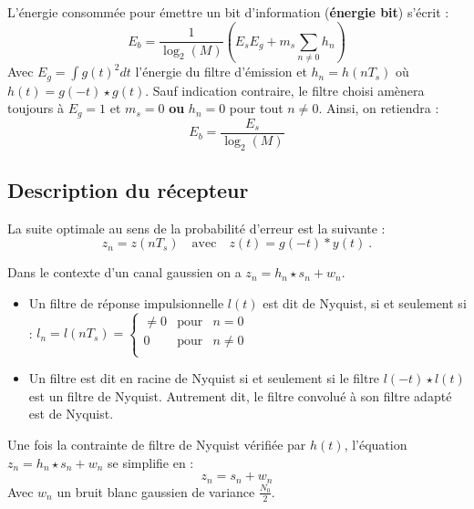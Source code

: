	\begin{pop}
		L'énergie consommée pour émettre un bit d'information (\textbf{énergie bit}) s'écrit :
		$$E_b = \frac{1}{\log_{2}(M)} \left( E_{s}E_{g}+m_{s} \sum_{n\neq 0} h_{n} \right)$$
		Avec $E_g=\int g(t)^2dt$ l'énergie du filtre d'émission et $h_n=h(nT_s)$ où $h(t)=g(-t)\star g(t)$.
		Sauf indication contraire, le filtre choisi amènera toujours à $E_g=1$ et $m_s=0$ \textbf{ou} $h_n=0$ pour tout $n\neq 0$. Ainsi, on retiendra :
		$$E_b = \frac{E_s}{\log_2(M)}$$
	\end{pop}

\subsection{Description du récepteur}

	\begin{pop}
		La suite optimale au sens de la probabilité d'erreur est la suivante :
		$$z_{n} = z(nT_{s}) \quad \text{avec} \quad z(t)=g(-t)*y(t)\ .$$
	\end{pop}

	\begin{pop}
	Dans le contexte d'un canal gaussien on a $z_{n} = h_{n} \star s_{n} + w_{n}$.
	\end{pop}

	\begin{defn}

		\begin{itemize}

		\item[\textbullet] Un filtre de réponse impulsionnelle $l(t)$ est dit de Nyquist, si et seulement si :
			$l_{n} = l(nT_{s}) =
			\left\{ \begin{array}{rcr}
				\neq 0 & \text{pour} & n = 0 \\
				0      & \text{pour} & n \neq 0 \\
			\end{array} \right.$
		\item[\textbullet] Un filtre est dit en racine de Nyquist si et seulement si le filtre $l(-t)\star l(t)$ est un filtre de Nyquist. Autrement dit, le filtre convolué à son filtre adapté est de Nyquist.
		\end{itemize}
	\end{defn}

	\begin{pop}
		Une fois la contrainte de filtre de Nyquist vérifiée par $h(t)$, l'équation $z_{n} = h_{n} \star s_{n} + w_{n}$ se simplifie en :
		$$z_{n} = s_{n} + w_{n}$$
		Avec $w_n$ un bruit blanc gaussien de variance $\frac{N_0}{2}$.
	\end{pop}

